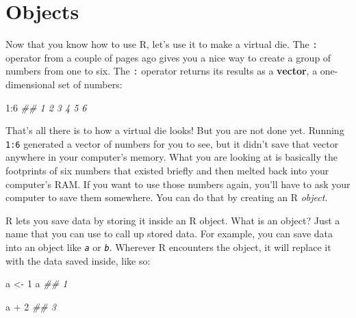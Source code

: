 \documentclass[
  letterpaper,
  DIV=11,
  numbers=noendperiod]{scrbook}
\newenvironment{Shaded}{\begin{snugshade}}{\end{snugshade}}
\newcommand{\DecValTok}[1]{\textcolor[rgb]{0.68,0.00,0.00}{#1}}
\newcommand{\DocumentationTok}[1]{\textcolor[rgb]{0.37,0.37,0.37}{\textit{#1}}}
\newcommand{\NormalTok}[1]{\textcolor[rgb]{0.00,0.23,0.31}{#1}}
\newcommand{\OtherTok}[1]{\textcolor[rgb]{0.00,0.23,0.31}{#1}}
\newcommand{\SpecialCharTok}[1]{\textcolor[rgb]{0.37,0.37,0.37}{#1}}
\begin{document}
\section{Objects}\label{objects}

Now that you know how to use R, let's use it to make a virtual die. The
\texttt{:} operator from a couple of pages ago gives you a nice way to
create a group of numbers from one to six. The \texttt{:} operator
returns its results as a \textbf{vector}, a one-dimensional set of
numbers:

\begin{Shaded}
\begin{Highlighting}[]
\DecValTok{1}\SpecialCharTok{:}\DecValTok{6}
\DocumentationTok{\#\# 1 2 3 4 5 6}
\end{Highlighting}
\end{Shaded}

That's all there is to how a virtual die looks! But you are not done
yet. Running \texttt{1:6} generated a vector of numbers for you to see,
but it didn't save that vector anywhere in your computer's memory. What
you are looking at is basically the footprints of six numbers that
existed briefly and then melted back into your computer's RAM. If you
want to use those numbers again, you'll have to ask your computer to
save them somewhere. You can do that by creating an R \emph{object}.

R lets you save data by storing it inside an R object. What is an
object? Just a name that you can use to call up stored data. For
example, you can save data into an object like \emph{\texttt{a}} or
\emph{\texttt{b}}. Wherever R encounters the object, it will replace it
with the data saved inside, like so:

\begin{Shaded}
\begin{Highlighting}[]
\NormalTok{a }\OtherTok{\textless{}{-}} \DecValTok{1}
\NormalTok{a}
\DocumentationTok{\#\# 1}

\NormalTok{a }\SpecialCharTok{+} \DecValTok{2}
\DocumentationTok{\#\# 3}
\end{Highlighting}
\end{Shaded}
\end{document}
